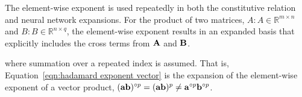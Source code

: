{\color{red}
The element-wise exponent is used repeatedly in both the constitutive relation and neural network expansions. For the product of two matrices, $A: A \in \mathbb{R}^{m \times n}$ and $B: B \in \mathbb{R}^{n \times q}$, the element-wise exponent results in an expanded basis that explicitly includes the cross terms from ${\bf A}$ and ${\bf B}$.

\begin{subequations}
\label{eqn:nondistributive hadamard}
\end{subequations}
where summation over a repeated index is assumed. That is, Equation~\ref{eqn:hadamard exponent vector} is the expansion of the element-wise exponent of a vector product, $({\bf a}{\bf b})\he{p} = ({\bf a}{\bf b})^p \ne \he[{\bf a}]{p}\he[{\bf b}]{p}$.
}

